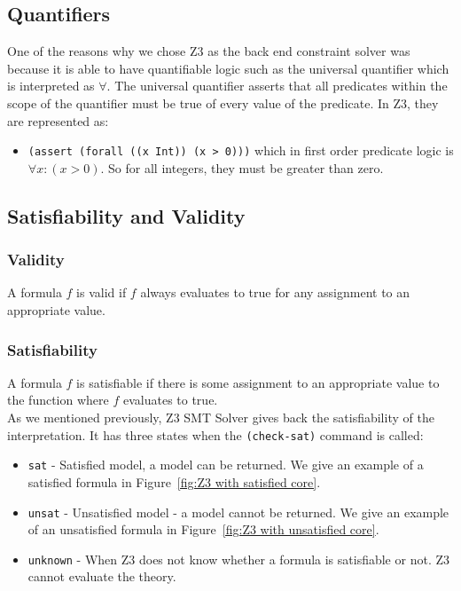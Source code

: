 \documentclass[a4paper]{report}
\begin{document}
\subsection{Quantifiers}
One of the reasons why we chose Z3 as the back end constraint solver was because it is able to have quantifiable logic such as the universal quantifier which is interpreted as  $\forall$. The universal quantifier asserts that all predicates within the scope of the quantifier must be true of every value of the predicate. In Z3, they are represented as:
\begin{itemize}
\item \texttt{(assert (forall ((x Int)) (x > 0)))} which in first order predicate logic is $\forall x: (x > 0)$. So for all integers, they must be greater than zero.
\end{itemize}

\subsection{Satisfiability and Validity}
\subsubsection{Validity}
A formula $f$ is valid if $f$ always evaluates to true for any assignment to an appropriate value. 
\subsubsection{Satisfiability}
A formula $f$ is satisfiable if there is some assignment to an appropriate value to the function where $f$ evaluates to true.\\

As we mentioned previously, Z3 SMT Solver gives back the satisfiability of the interpretation. It has three states when the \texttt{(check-sat)} command is called:
\begin{itemize}
\item \texttt{sat} - Satisfied model, a model can be returned. We give an example of a satisfied formula in Figure~\ref{fig:Z3 with satisfied core}.
\item \texttt{unsat} - Unsatisfied model - a model cannot be returned. We give an example of an unsatisfied formula in Figure~\ref{fig:Z3 with unsatisfied core}.
\item \texttt{unknown} - When Z3 does not know whether a formula is satisfiable or not. Z3 cannot evaluate the theory.
\end{itemize}
\end{document}
